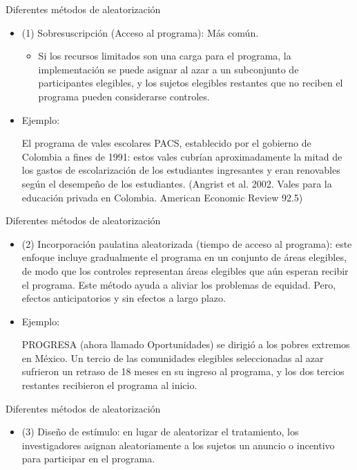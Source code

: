 \documentclass[11pt, aspectratio=169, compress]{beamer}
\begin{document}
\begin{frame}{Diferentes métodos de aleatorización}
	\begin{itemize}
		\item (1) Sobresuscripción (Acceso al programa): Más común. 
		\begin{itemize}
			\item Si los recursos limitados son una carga para el programa, la implementación se puede asignar al azar a un subconjunto de participantes elegibles, y los sujetos elegibles restantes que no reciben el programa pueden considerarse controles.
		\end{itemize}	
		\item Ejemplo: 
		
		El programa de vales escolares PACS, establecido por el gobierno de Colombia a fines de 1991: estos vales cubrían aproximadamente la mitad de los gastos de escolarización de los estudiantes ingresantes y eran renovables según el desempeño de los estudiantes. (Angrist et al. 2002. Vales para la educación privada en Colombia. American Economic Review 92.5)
	\end{itemize}
\end{frame}
\begin{frame}{Diferentes métodos de aleatorización}
	\begin{itemize}
		\item (2) Incorporación paulatina aleatorizada (tiempo de acceso al programa): este enfoque incluye gradualmente el programa en un conjunto de áreas elegibles, de modo que los controles representan áreas elegibles que aún esperan recibir el programa. Este método ayuda a aliviar los problemas de equidad. Pero, efectos anticipatorios y sin efectos a largo plazo.	
		\item Ejemplo: 
		
		PROGRESA (ahora llamado Oportunidades) se dirigió a los pobres extremos en México. Un tercio de las comunidades elegibles seleccionadas al azar sufrieron un retraso de 18 meses en su ingreso al programa, y los dos tercios restantes recibieron el programa al inicio.
	\end{itemize}
\end{frame}
\begin{frame}{Diferentes métodos de aleatorización}
	\begin{itemize}
		\item (3) Diseño de estímulo: en lugar de aleatorizar el tratamiento, los investigadores asignan aleatoriamente a los sujetos un anuncio o incentivo para participar en el programa.
	\end{itemize}
\end{frame}
\end{document}
